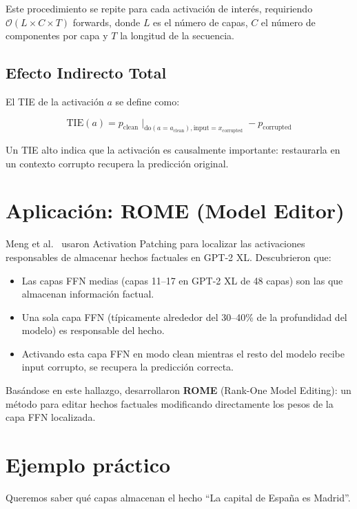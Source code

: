 \documentclass[11pt,a4paper]{report}
\theoremstyle{definition}
\begin{document}
Este procedimiento se repite para cada activación de interés, requiriendo $\mathcal{O}(L \times C \times T)$ forwards, donde $L$ es el número de capas, $C$ el número de componentes por capa y $T$ la longitud de la secuencia.

\subsection{Efecto Indirecto Total}

El TIE de la activación $a$ se define como:

\[
\text{TIE}(a) = p_{\text{clean}} \mid_{\text{do}(a = a_{\text{clean}}), \text{input}=x_{\text{corrupted}}} - p_{\text{corrupted}}
\]

Un TIE alto indica que la activación es causalmente importante: restaurarla en un contexto corrupto recupera la predicción original.

\section{Aplicación: ROME (Model Editor)}

Meng et al.~\cite{meng2022rome} usaron Activation Patching para localizar las activaciones responsables de almacenar hechos factuales en GPT-2 XL. Descubrieron que:

\begin{itemize}
    \item Las capas FFN medias (capas 11--17 en GPT-2 XL de 48 capas) son las que almacenan información factual.
    \item Una sola capa FFN (típicamente alrededor del 30--40\% de la profundidad del modelo) es responsable del hecho.
    \item Activando esta capa FFN en modo clean mientras el resto del modelo recibe input corrupto, se recupera la predicción correcta.
\end{itemize}

Basándose en este hallazgo, desarrollaron \textbf{ROME} (Rank-One Model Editing): un método para editar hechos factuales modificando directamente los pesos de la capa FFN localizada.

\section{Ejemplo práctico}

Queremos saber qué capas almacenan el hecho ``La capital de España es Madrid''.
\end{document}
